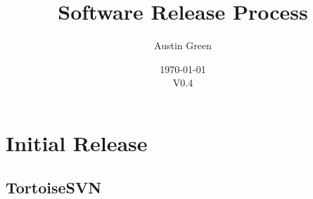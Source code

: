 \documentclass[10pt]{article}
\title{Software Release Process}
\author{Austin Green}
\date{\today\\V0.4}
\begin{document}
    \begin{titlepage}
    \maketitle
    \thispagestyle{empty}
    \end{titlepage}

	\tableofcontents
	\newpage

    \section{Initial Release}
        \subsection{TortoiseSVN}
\end{document}
